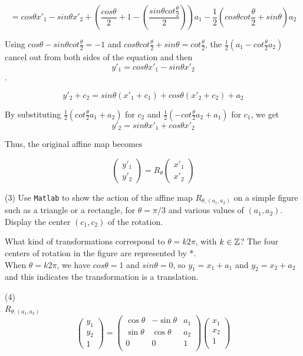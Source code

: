 \documentclass[12pt]{article}
\begin{document}
$$ = cos\theta x'_1  - sin\theta x'_2 + (\frac {cos\theta}{2} + 1 - (\frac{sin\theta cot \frac{\theta}{2}}{2} ))a_1 - \frac{1}{2}(cos\theta cot \frac{\theta}{2} + sin\theta) a_2$$

Using $cos\theta - sin\theta cot \frac{\theta}{2} = -1$ and $cos\theta cot \frac{\theta}{2} + sin\theta = cot \frac{\theta}{2}$, the $\frac{1}{2} (a_1 - cot \frac{\theta}{2}a_2)$ cancel out from both sides of the equation and then $$y'_1 = cos\theta x'_1 - sin\theta x'_2$$.

$$y'_2 + c_2 = sin\theta (x'_1+ c_1) + cos\theta (x'_2 +c_2) + a_2$$

By substituting $\frac{1}{2} \left( cot \frac{\theta}{2} a_1+a_2 \right)$ for $c_2$ and $\frac{1}{2} \left( -cot \frac{\theta}{2} a_2+a_1 \right)$ for $c_1$, we get\\ 

 $$y'_2 = sin\theta x'_1 + cos\theta x'_2$$
 
 Thus, the original affine map becomes 
 
 $$ \begin{pmatrix}y'_1 \\y'_2\end{pmatrix}= R_\theta \begin{pmatrix}x'_1 \\x'_2\end{pmatrix}$$

\medskip
(3)
Use {\tt Matlab} to show the action of  the affine map
$R_{\theta, (a_1,a_2)}$ on a simple figure such as
a triangle or a rectangle,
for $\theta = \pi/3$ and various values of $(a_1, a_2)$.
Display the center $(c_1, c_2)$ of the rotation.

\medskip
What kind of transformations correspond to
$\theta= k 2\pi$, with $k \in \mathbb{Z}$?
The four centers of rotation in the figure are represented by *.\\
When $\theta = k2\pi$, we have $cos\theta=1$ and $sin\theta=0$, 
so $y_1 = x_1 + a_1$ and $y_2=x_2 + a_2$ and this indicates the transformation is a translation.

\medskip
(4) \\

$R_{\theta, (a_1,a_2)}$ \\
\[
\begin{pmatrix}
y_1 \\
y_2 \\
1
\end{pmatrix}
=
\begin{pmatrix}
\cos\theta & -\sin\theta & a_1 \\
\sin\theta & \cos\theta & a_2 \\
0 & 0 & 1 \\
\end{pmatrix}
\begin{pmatrix}
x_1 \\
x_2 \\
1 \\
\end{pmatrix}
\]
\end{document}
